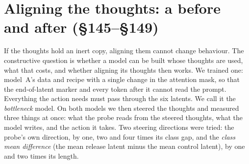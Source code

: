 \documentclass{article}
\begin{document}
\section{Aligning the thoughts: a before and after (\S145--\S149)}

If the thoughts hold an inert copy, aligning them cannot change behaviour. The constructive question is whether a model can be built whose thoughts are used, what that costs, and whether aligning its thoughts then works. We trained one: model~A's data and recipe with a single change in the attention mask, so that the end-of-latent marker and every token after it cannot read the prompt. Everything the action needs must pass through the six latents. We call it the \emph{bottleneck} model. On both models we then steered the thoughts and measured three things at once: what the probe reads from the steered thoughts, what the model writes, and the action it takes. Two steering directions were tried: the probe's own direction, by one, two and four times its class gap, and the \emph{class mean difference} (the mean release latent minus the mean control latent), by one and two times its length.
\end{document}
